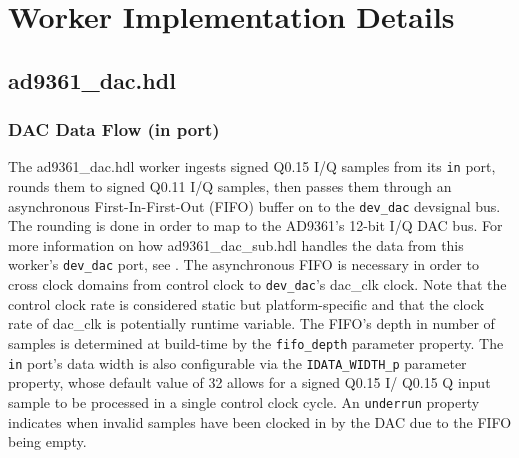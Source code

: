 \documentclass{article}
\def\devsignal{devsignal}
\def\comp{ad9361\_dac}
\begin{document}
\pagebreak

\section*{Worker Implementation Details}
\subsection*{\comp.hdl}
\subsubsection*{DAC Data Flow (in port)}
The \comp{}.hdl worker ingests signed Q0.15 I/Q samples from its \verb+in+ port, rounds them to signed Q0.11 I/Q samples, then passes them through an asynchronous First-In-First-Out (FIFO) buffer on to the \verb+dev_dac+ \devsignal{} bus. The rounding is done in order to map to the AD9361's 12-bit I/Q DAC bus\cite{adi_ug570}. For more information on how ad9361\_dac\_sub.hdl handles the data from this worker's \verb+dev_dac+ port, see \cite{dac_sub_comp_datasheet}. The asynchronous FIFO is necessary in order to cross clock domains from control clock to \verb+dev_dac+'s dac\_clk clock. Note that the control clock rate is considered static but platform-specific and that the clock rate of dac\_clk is potentially runtime variable. The FIFO's depth in number of samples is determined at build-time by the \verb+fifo_depth+ parameter property. The \verb+in+ port's data width is also configurable via the \verb+IDATA_WIDTH_p+ parameter property, whose default value of 32 allows for a signed Q0.15 I/ Q0.15 Q input sample to be processed in a single control clock cycle. An \verb+underrun+ property indicates when invalid samples have been clocked in by the DAC due to the FIFO being empty.
\end{document}
